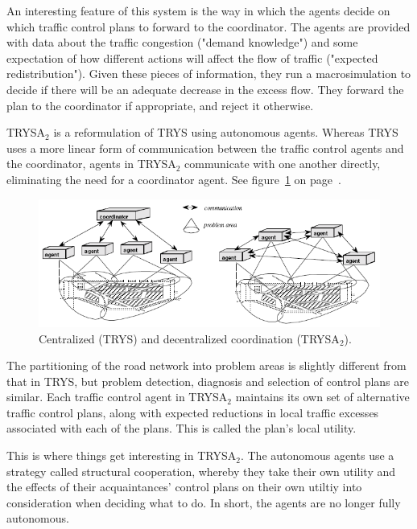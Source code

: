 \documentclass[11pt,letterpaper,onecolumn,twoside,openright,draft]{report}
\begin{document}
An interesting feature of this system is the way in which the agents decide on which traffic control plans to forward to the coordinator.
The agents are provided with data about the traffic congestion ("demand knowledge") and some expectation of how different actions will affect the flow
of traffic ("expected redistribution").
Given these pieces of information, they run a macrosimulation to decide if there will be an adequate decrease in the excess flow.
They forward the plan to the coordinator if appropriate, and reject it otherwise.

TRYSA$_{2}$ is a reformulation of TRYS using autonomous agents.
Whereas TRYS uses a more linear form of communication between the traffic control agents and the coordinator, agents in TRYSA$_{2}$ communicate with one another directly, eliminating the need for a coordinator agent.
See figure~\ref{fig:TRYS-and-TRYSA2} on page~\pageref{fig:TRYS-and-TRYSA2}.

\begin{figure}[h]
  \includegraphics{figures/TRYS-and-TRYSA2.PNG}
  \caption{Centralized (TRYS) and decentralized coordination (TRYSA$_{2}$).}
  \label{fig:TRYS-and-TRYSA2}
\end{figure}

The partitioning of the road network into problem areas is slightly different from that in TRYS, but problem detection, diagnosis and selection of control plans are similar.
Each traffic control agent in TRYSA$_{2}$ maintains its own set of alternative traffic control plans, along with expected reductions in local traffic excesses associated with each of the plans.
This is called the plan's local utility.

This is where things get interesting in TRYSA$_{2}$.
The autonomous agents use a strategy called structural cooperation\cite{ossowski1999}, whereby they take their own utility and the effects of their acquaintances' control plans on their own utiltiy into consideration when deciding what to do.
In short, the agents are no longer fully autonomous.
\end{document}
